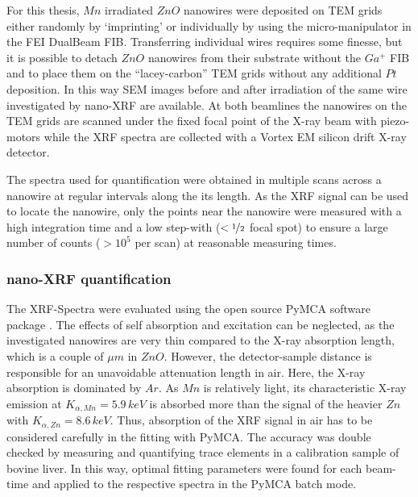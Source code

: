 For this thesis, $Mn$ irradiated $ZnO$ nanowires were deposited on TEM grids either randomly by `imprinting' or individually by using the micro-manipulator in the FEI DualBeam FIB. Transferring individual wires requires some finesse, but it is possible to detach $ZnO$ nanowires from their substrate without the $Ga^+$ FIB and to place them on the ``lacey-carbon'' TEM grids without any additional $Pt$ deposition. In this way SEM images before and after irradiation of the same wire investigated by nano-XRF are available. At both beamlines the nanowires on the TEM grids are scanned under the fixed focal point of the X-ray beam with piezo-motors while the XRF spectra are collected with a Vortex EM silicon drift X-ray detector.

The spectra used for quantification were obtained in multiple scans across a nanowire at regular intervals along the its length. As the XRF signal can be used to locate the nanowire, only the points near the nanowire were measured with a high integration time and a low step-with ($< \nicefrac{1}{2}$ focal spot) to ensure a large number of counts ($> 10^5$ per scan) at reasonable measuring times.

\vfill
\subsubsection{nano-XRF quantification}

The XRF-Spectra were evaluated using the open source PyMCA software package \cite{sole_multiplatform_2007}. The effects of self absorption and excitation can be neglected, as the investigated nanowires are very thin compared to the X-ray absorption length, which is a couple of $\mu m$ in $ZnO$. However, the detector-sample distance is responsible for an unavoidable attenuation length in air. Here, the X-ray absorption is dominated by $Ar$. As $Mn$ is relatively light, its characteristic X-ray emission at $K_{\alpha,Mn} = 5.9\,keV$ is absorbed more than the signal of the heavier $Zn$ with $K_{\alpha,Zn} = 8.6\,keV$. Thus, absorption of the XRF signal in air has to be considered carefully in the fitting with PyMCA. The accuracy was double checked by measuring and quantifying trace elements in a calibration sample of bovine liver. In this way, optimal fitting parameters were found for each beam-time and applied to the respective spectra in the PyMCA batch mode. 

